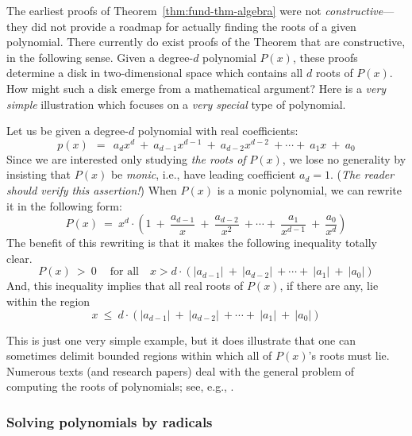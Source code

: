 
\medskip

The earliest proofs of Theorem~\ref{thm:fund-thm-algebra} were not {\em constructive}---they did not provide a roadmap for actually finding the roots of a given polynomial.  There currently do exist proofs of the Theorem that are constructive, in the following sense.  Given a degree-$d$ polynomial $P(x)$, these proofs determine a disk in two-dimensional space which contains all $d$ roots of $P(x)$.  How might such a disk emerge from a mathematical argument?  Here is a {\em very simple} illustration which focuses on a {\em very special} type of polynomial.

Let us be given a degree-$d$ polynomial with real coefficients:
\[ p(x) \ \ = \ \ a_d x^d \ + \ a_{d-1} x^{d-1} \ + \ a_{d-2} x^{d-2}
\ + \cdots + \ a_1 x \ + \ a_0
\]
Since we are interested only studying {\em the roots of} $P(x)$, we lose no generality by insisting that $P(x)$ be {\em monic}, i.e., have leading coefficient $a_d = 1$.  ({\em The reader should verify this assertion!})  When $P(x)$ is a monic polynomial, we can rewrite it in the following form:
\[ P(x) \ = \ 
x^d \cdot \left( 1 \ + \ \frac{a_{d-1}}{x} \ + \ \frac{a_{d-2}}{x^2}
\ + \cdots + \ \frac{a_1}{x^{d-1}} \ + \ \frac{a_0}{x^d} \right)
\]
The benefit of this rewriting is that it makes the following inequality totally clear.
\[ P(x) \ >  \ 0 \ \ \ \ \mbox{ for all } \ \ \ x >
d \cdot \left(|a_{d-1}| \ + \ |a_{d-2}| \ + \cdots + \ |a_1| \ + \ |a_0| \right)
\]
And, this inequality implies that all real roots of $P(x)$, if there are any, lie within the region
\[ x \ \leq \ d \cdot \left(|a_{d-1}| \ + \ |a_{d-2}| \ + \cdots + \ |a_1| \ + \ |a_0| \right) \]
\index{polynomial!monic}

\medskip

This is just one very simple example, but it does illustrate that one can sometimes delimit bounded regions within which all of $P(x)$'s roots must lie.  Numerous texts (and research papers) deal with the general problem of computing the roots of polynomials; see, e.g., \cite{MacDuffee}.


\subsubsection{Solving polynomials by radicals}
\label{sec:poly-by-radical}

